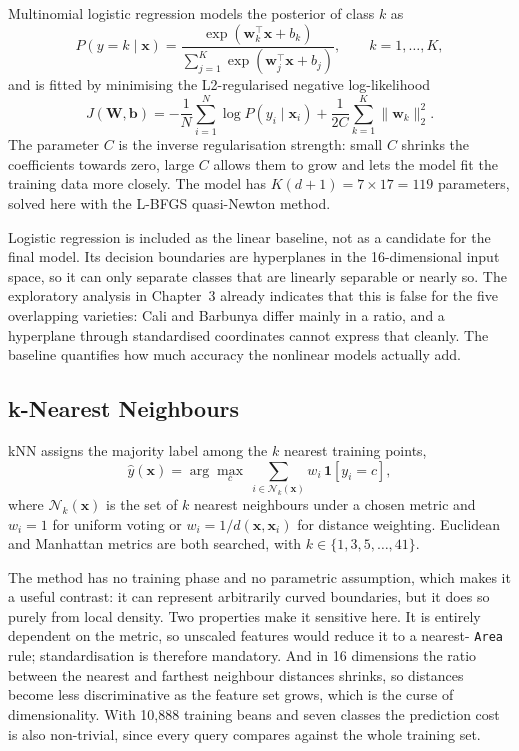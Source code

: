 Multinomial logistic regression models the posterior of class $k$ as
\begin{equation}
  P(y = k \mid \mathbf{x}) =
  \frac{\exp(\mathbf{w}_k^{\top}\mathbf{x} + b_k)}
       {\sum_{j=1}^{K}\exp(\mathbf{w}_j^{\top}\mathbf{x} + b_j)},
  \qquad k = 1,\dots,K,
  \label{eq:softmax}
\end{equation}
and is fitted by minimising the L2-regularised negative log-likelihood
\begin{equation}
  J(\mathbf{W}, \mathbf{b}) =
  -\frac{1}{N}\sum_{i=1}^{N}\log P(y_i \mid \mathbf{x}_i)
  + \frac{1}{2C}\sum_{k=1}^{K}\|\mathbf{w}_k\|_2^{2}.
  \label{eq:lr-objective}
\end{equation}
The parameter $C$ is the inverse regularisation strength: small $C$ shrinks the
coefficients towards zero, large $C$ allows them to grow and lets the model fit
the training data more closely. The model has $K(d+1) = 7 \times 17 = 119$
parameters, solved here with the L-BFGS quasi-Newton method.

Logistic regression is included as the linear baseline, not as a candidate for the
final model. Its decision boundaries are hyperplanes in the 16-dimensional input
space, so it can only separate classes that are linearly separable or nearly so.
The exploratory analysis in Chapter~3 already indicates that this is false for the
five overlapping varieties: Cali and Barbunya differ mainly in a ratio, and a
hyperplane through standardised coordinates cannot express that cleanly. The
baseline quantifies how much accuracy the nonlinear models actually add.

\subsection{k-Nearest Neighbours}

kNN assigns the majority label among the $k$ nearest training points,
\begin{equation}
  \hat{y}(\mathbf{x}) =
  \arg\max_{c}\ \sum_{i \in \mathcal{N}_k(\mathbf{x})} w_i\,
  \mathbf{1}[y_i = c],
  \label{eq:knn}
\end{equation}
where $\mathcal{N}_k(\mathbf{x})$ is the set of $k$ nearest neighbours under a
chosen metric and $w_i = 1$ for uniform voting or $w_i = 1/d(\mathbf{x},
\mathbf{x}_i)$ for distance weighting. Euclidean and Manhattan metrics are both
searched, with $k \in \{1,3,5,\dots,41\}$.

The method has no training phase and no parametric assumption, which makes it a
useful contrast: it can represent arbitrarily curved boundaries, but it does so
purely from local density. Two properties make it sensitive here. It is entirely
dependent on the metric, so unscaled features would reduce it to a nearest-
\texttt{Area} rule; standardisation is therefore mandatory. And in 16 dimensions
the ratio between the nearest and farthest neighbour distances shrinks, so
distances become less discriminative as the feature set grows, which is the
curse of dimensionality. With 10,888 training beans and seven classes the
prediction cost is also non-trivial, since every query compares against the whole
training set.

